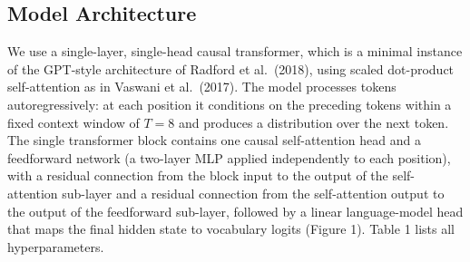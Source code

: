 \documentclass[
  11pt,
  a4paper,
]{article}
\begin{document}
\subsection{Model Architecture}\label{model-architecture}

We use a single-layer, single-head causal transformer, which is a
minimal instance of the GPT-style architecture of Radford et al.~(2018),
using scaled dot-product self-attention as in Vaswani et al.~(2017). The
model processes tokens autoregressively: at each position it conditions
on the preceding tokens within a fixed context window of \(T = 8\) and
produces a distribution over the next token. The single transformer
block contains one causal self-attention head and a feedforward network
(a two-layer MLP applied independently to each position), with a
residual connection from the block input to the output of the
self-attention sub-layer and a residual connection from the
self-attention output to the output of the feedforward sub-layer,
followed by a linear language-model head that maps the final hidden
state to vocabulary logits (Figure 1). Table 1 lists all
hyperparameters.
\end{document}
